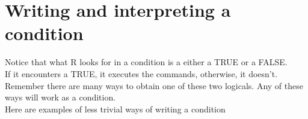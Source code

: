 \documentclass[]{book}
\newenvironment{Shaded}{}{}
\newcommand{\CommentTok}[1]{\textcolor[rgb]{0.38,0.63,0.69}{\textit{#1}}}
\newcommand{\DecValTok}[1]{\textcolor[rgb]{0.25,0.63,0.44}{#1}}
\newcommand{\NormalTok}[1]{#1}
\newcommand{\OperatorTok}[1]{\textcolor[rgb]{0.40,0.40,0.40}{#1}}
\newcommand{\OtherTok}[1]{\textcolor[rgb]{0.00,0.44,0.13}{#1}}
\newcommand{\StringTok}[1]{\textcolor[rgb]{0.25,0.44,0.63}{#1}}
\theoremstyle{definition}
\theoremstyle{definition}
\theoremstyle{definition}
\theoremstyle{remark}
\begin{document}
\begin{Shaded}
\end{Shaded}

\hypertarget{writing-and-interpreting-a-condition}{%
\section{Writing and interpreting a
condition}\label{writing-and-interpreting-a-condition}}

Notice that what R looks for in a condition is a either a TRUE or a
FALSE.\\
If it encounters a TRUE, it executes the commands, otherwise, it
doesn't.\\
Remember there are many ways to obtain one of these two logicals. Any of
these ways will work as a condition.\\
Here are examples of less trivial ways of writing a condition
\end{document}
